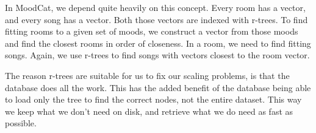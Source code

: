 In MoodCat, we depend quite heavily on this concept.
Every room has a vector, and every song has a vector.
Both those vectors are indexed with r-trees.
To find fitting rooms to a given set of moods, we construct a vector from those moods and find the closest rooms in order of closeness.
In a room, we need to find fitting songs.
Again, we use r-trees to find songs with vectors closest to the room vector.

The reason r-trees are suitable for us to fix our scaling problems, is that the database does all the work.
This has the added benefit of the database being able to load only the tree to find the correct nodes, not the entire dataset.
This way we keep what we don't need on disk, and retrieve what we do need as fast as possible.